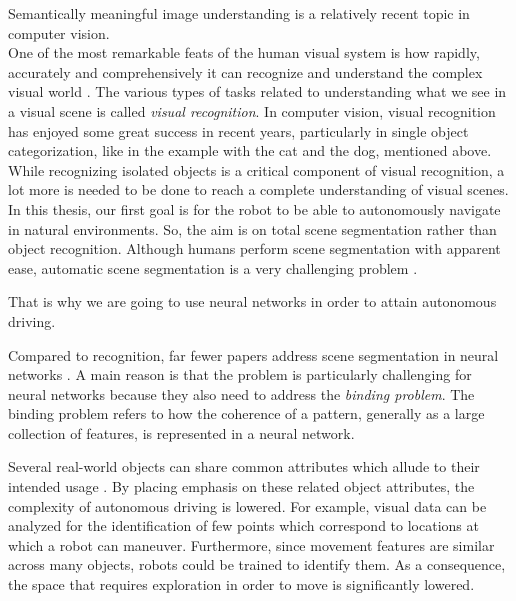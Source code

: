 \documentclass[12pt,a4paper]{report}
\newcommand{\term}{\textit}
\begin{document}
	
	
	Semantically meaningful image understanding is a relatively recent topic in computer vision.
	\\
	
	
	One of the most remarkable feats of the human visual system is how rapidly, 
	accurately and comprehensively it can recognize and understand the complex visual 
	world \citep{Socher}. The various types of tasks related to understanding what 
	we see in a visual scene is called \term{visual recognition}. In computer vision, 
	visual recognition has enjoyed some great success in recent years, particularly 
	in single object categorization, like in the example with the cat and the dog, 
	mentioned above. While recognizing isolated objects is a critical component of 
	visual recognition, a lot more is needed to be done to reach a complete 
	understanding of visual scenes.
	\\
	
	
	In this thesis, our first goal is for the robot to be able to autonomously 
	navigate in natural environments. So, the aim is on total scene segmentation 
	rather than object recognition. Although humans perform scene segmentation with 
	apparent ease, automatic scene segmentation is a very challenging problem 
	\citep{Wang}. 
	\par
	That is why we are going to use neural networks in order to attain 
	autonomous driving. 
	\par
	Compared to recognition, far fewer papers address scene segmentation in neural 
	networks \cite{Wang}. A main reason is that the problem is particularly 
	challenging for neural networks because they also need to address the \term{binding 
	problem}. The binding problem refers to how the coherence of a pattern, generally 
	as a large collection of features, is represented in a neural network. 
	\par
	Several real-world objects can share common attributes which allude to their 
	intended usage \citep{Shabbir}. By placing emphasis on these related object 
	attributes, the complexity of autonomous driving is lowered. For example, visual 
	data can be analyzed for the identification of few points which correspond to 
	locations at which a robot can maneuver. Furthermore, since movement features 
	are similar across many objects, robots could be trained to identify them. As a 
	consequence, the space that requires exploration in order to move is 
	significantly lowered.
	\\
	
\end{document}
